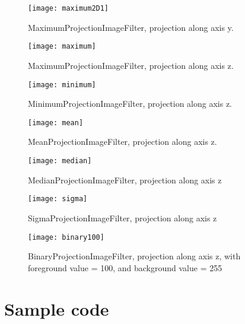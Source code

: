 \documentclass{InsightArticle}
\begin{document}
\begin{figure}[htbp]
\centering
\texttt{[image: maximum2D1]}
\caption{MaximumProjectionImageFilter, projection along axis y.\label{maximum1}}
\end{figure}

\begin{figure}[htbp]
\centering
\texttt{[image: maximum]}
\caption{MaximumProjectionImageFilter, projection along axis z.\label{maximum}}
\end{figure}

\begin{figure}[htbp]
\centering
\texttt{[image: minimum]}
\caption{MinimumProjectionImageFilter, projection along axis z.\label{minimum}}
\end{figure}

\begin{figure}[htbp]
\centering
\texttt{[image: mean]}
\caption{MeanProjectionImageFilter, projection along axis z.\label{mean}}
\end{figure}

\begin{figure}[htbp]
\centering
\texttt{[image: median]}
\caption{MedianProjectionImageFilter, projection along axis z\label{median}}
\end{figure}

\begin{figure}[htbp]
\centering
\texttt{[image: sigma]}
\caption{SigmaProjectionImageFilter, projection along axis z\label{sigma}}
\end{figure}

\begin{figure}[htbp]
\centering
\texttt{[image: binary100]}
\caption{BinaryProjectionImageFilter, projection along axis z, with foreground value = 100, and background value = 255\label{binary100}}
\end{figure}

\section{Sample code}
\end{document}
